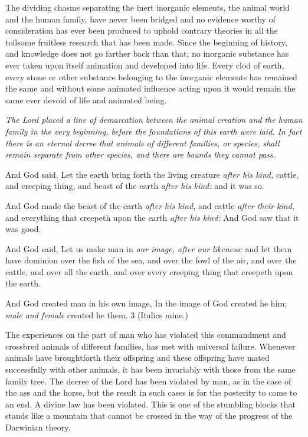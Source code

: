 The dividing chasms separating the inert inorganic elements, the animal world and the human
family, have never been bridged and no evidence worthy of consideration has ever been
produced to uphold contrary theories in all the toilsome fruitless research that has been made.
Since the beginning of history, and knowledge does not go farther back than that, no
inorganic substance has ever taken upon itself animation and developed into life. Every clod
of earth, every stone or other substance belonging to the inorganic elements has remained the
same and without some animated influence acting upon it would remain the same ever
devoid of life and animated being.

\textit{The Lord placed a line of demarcation between the animal creation and the human family in
the very beginning, before the foundations of this earth were laid. In fact there is an eternal
decree that animals of different families, or species, shall remain separate from other
species, and there are bounds they cannot pass.}

And God said, Let the earth bring forth the living creature \textit{after his kind,} cattle, and creeping
thing, and beast of the earth \textit{after his kind:} and it was so.

And God made the beast of the earth \textit{after his kind,} and cattle \textit{after their kind,} and everything
that creepeth upon the earth \textit{after his kind:} And God saw that it was good.

And God said, Let us make man in \textit{our image, after our likeness:} and let them have dominion
over the fish of the sea, and over the fowl of the air, and over the cattle, and over all the
earth, and over every creeping thing that creepeth upon the earth.

And God created man in his own image, In the image of God created he him; \textit{male and
female} created he them. 3 (Italics mine.)

The experiences on the part of man who has violated this commandment and crossbred
animals of different families, has met with universal failure. Whenever animals have broughtforth their offspring and these offspring have mated successfully with other animals, it has
been invariably with those from the same family tree. The decree of the Lord has been
violated by man, as in the case of the ass and the horse, but the result in such cases is for the
posterity to come to an end. A divine law has been violated. This is one of the stumbling
blocks that stands like a mountain that cannot be crossed in the way of the progress of the
Darwinian theory.

